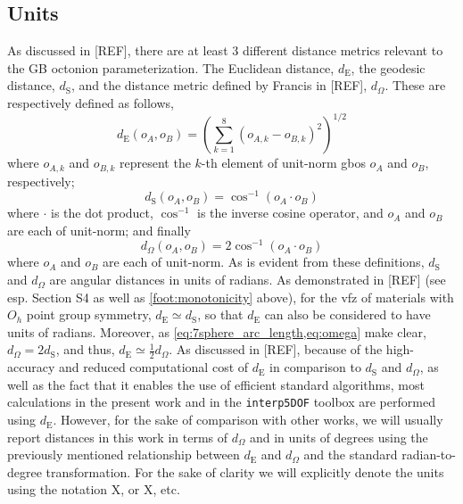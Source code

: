 \documentclass[final,twocolumn,12pt]{elsarticle}
\begin{document}
	\subsection{Units}
	\label{sec:methods:units}
	As discussed in [REF], there are at least 3 different distance metrics relevant to the GB octonion parameterization. The Euclidean distance, $d_\text{E}$, the geodesic distance, $d_\text{S}$, and the distance metric defined by Francis in [REF], $d_{\Omega}$. These are respectively defined as follows,
	\begin{equation}
        \label{eq:8Deuclidean_dist}
        d_{\text{E}}\!\left(o_{A},o_{B}\right) = {\left(\sum_{k=1}^{8} {\left(o_{A,k} - o_{B,k}\right)}^2 \right)}^{1/2}
    \end{equation}
    where $o_{A,k}$ and $o_{B,k}$ represent the $k$-th element of unit-norm \glspl{gbo} $o_A$ and $o_B$, respectively; 
    \begin{equation}
        \label{eq:7sphere_arc_length}
        d_{\text{S}}\!\left(o_{A},o_{B}\right)=\cos ^{-1}\left(o_A\cdot o_B\right)
    \end{equation}
    where $\cdot$ is the dot product, $\cos ^{-1}$ is the inverse cosine operator, and $o_A$ and $o_B$ are each of unit-norm; and finally
    \begin{equation}
        \label{eq:omega}
        d_\Omega\!\left(o_{A},o_{B}\right) = 2\cos ^{-1}\left(o_A\cdot o_B\right)
    \end{equation}
    where $o_A$ and $o_B$ are each of unit-norm. As is evident from these definitions, $d_\text{S}$ and $d_\Omega$ are angular distances in units of radians. As demonstrated in [REF] (see esp. Section S4 as well as \cref{foot:monotonicity} above), for the \gls{vfz} of materials with $O_h$ point group symmetry, $d_\text{E} \simeq d_\text{S}$, so that $d_\text{E}$ can also be considered to have units of radians. Moreover, as \cref{eq:7sphere_arc_length,eq:omega} make clear, $d_\Omega = 2 d_{\text{S}}$, and thus, $d_\text{E}\simeq \frac{1}{2}d_\Omega$. As discussed in [REF], because of the high-accuracy and reduced computational cost of $d_\text{E}$ in comparison to $d_\text{S}$ and $d_{\Omega}$, as well as the fact that it enables the use of efficient standard algorithms, most calculations in the present work and in the \texttt{interp5DOF} toolbox are performed using $d_\text{E}$. However, for the sake of comparison with other works, we will usually report distances in this work in terms of $d_{\Omega}$ and in units of degrees using the previously mentioned relationship between $d_\text{E}$ and $d_{\Omega}$ and the standard radian-to-degree transformation. For the sake of clarity we will explicitly denote the units using the notation \SI[number-math-rm = \mathnormal, parse-numbers = false]{X}{\tobydeg}, or \SI[number-math-rm = \mathnormal, parse-numbers = false]{X}{\eucdeg}, etc.
    
\end{document}
